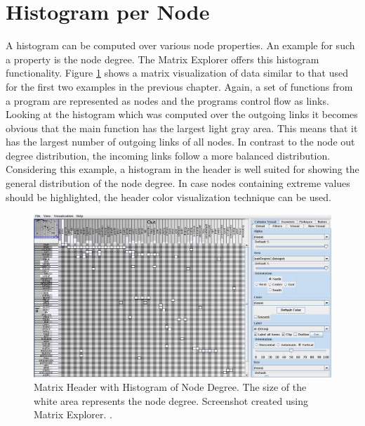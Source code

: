 \section{Histogram per Node}
\label{sec:histogram-per-node}
A histogram can be computed over various node properties. An example for such a property is the node degree. The Matrix Explorer offers this histogram functionality. Figure \ref{fig:header_matrixexplorer_histogram} shows a matrix visualization of data similar to that used for the first two examples in the previous chapter. Again, a set of functions from a program are represented as nodes and the programs control flow as links. Looking at the histogram which was computed over the outgoing links it becomes obvious that the main function has the largest light gray area. This means that it has the largest number of outgoing links of all nodes. In contrast to the node out degree distribution, the incoming links follow a more balanced distribution. Considering this example, a histogram in the header is well suited for showing the general distribution of the node degree. In case nodes containing extreme values should be highlighted, the header color visualization technique can be used.
\begin{figure}[H]
  \includegraphics[width=\textwidth]{images/Header_MatrixExplorer_histogram.png}
  \caption{Matrix Header with Histogram of Node Degree. The size of the white area represents the node degree. Screenshot created using Matrix Explorer. \citep{henry-phd-2008}. \label{fig:header_matrixexplorer_histogram}}
\end{figure}

